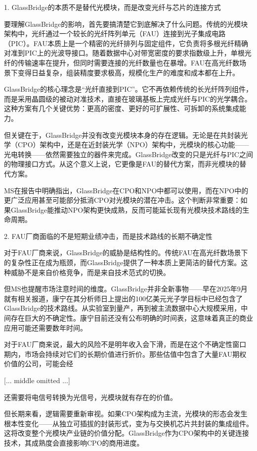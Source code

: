 \documentclass[11pt]{ctexart}
\begin{document}
1. GlassBridge的本质不是替代光模块，而是改变光纤与芯片的连接方式

要理解GlassBridge的影响，首先要搞清楚它到底解决了什么问题。传统的光模块架构中，光纤通过一个较长的光纤阵列单元（FAU）连接到光子集成电路（PIC）。FAU本质上是一个精密的光纤排列与固定组件，它负责将多根光纤精确对准到PIC上的光波导接口。随着数据中心对带宽密度的要求指数级上升，单根光纤的传输速率在提升，但同时需要连接的光纤数量也在暴增。FAU在高光纤数场景下变得日益复杂，组装精度要求极高，规模化生产的难度和成本都在上升。

GlassBridge的核心理念是“光纤直接到PIC”。它不再依赖传统的长光纤阵列组件，而是采用晶圆级的被动对准技术，直接在玻璃基板上完成光纤与PIC的光学耦合。这种方案有几个关键优势：更高的密度、更好的可扩展性、可拆卸的系统集成能力。

但关键在于，GlassBridge并没有改变光模块本身的存在逻辑。无论是在共封装光学（CPO）架构中，还是在近封装光学（NPO）架构中，光模块的核心功能——光电转换——依然需要独立的器件来完成。GlassBridge改变的只是光纤与PIC之间的物理接口方式。从这个意义上说，它更像是FAU的替代方案，而非光模块的替代方案。

MS在报告中明确指出，GlassBridge在CPO和NPO中都可以使用，而在NPO中的更广泛应用甚至可能部分抵消CPO对光模块的潜在冲击。这个判断非常重要：如果GlassBridge能推动NPO架构更快成熟，反而可能延长现有光模块技术路线的生命周期。

2. FAU厂商面临的不是短期业绩冲击，而是技术路线的长期不确定性

对于FAU厂商来说，GlassBridge的威胁是结构性的。传统FAU在高光纤数场景下的复杂性正在成为瓶颈，而GlassBridge提供了一种本质上更简洁的替代方案。这种威胁不是来自价格竞争，而是来自技术范式的切换。

但MS也提醒市场注意时间的维度。GlassBridge并非全新事物——早在2025年9月就有相关报道，康宁在其分析师日上提出的100亿美元光子学目标中已经包含了GlassBridge的技术路线。从实验室到量产，再到被主流数据中心大规模采用，中间存在巨大的不确定性。康宁目前还没有公布明确的时间表，这意味着真正的商业应用可能还需要数年时间。

对于FAU厂商来说，最大的风险不是明年收入会下滑，而是在这个不确定性窗口期内，市场会持续对它们的长期价值进行折价。那些估值中包含了大量FAU期权价值的公司，可能会经

[... middle omitted ...]

还需要将电信号转换为光信号，光模块就有存在的价值。

但长期来看，逻辑需要重新审视。如果CPO架构成为主流，光模块的形态会发生根本性变化——从独立可插拔的封装形式，变为与交换机芯片共封装的集成组件。这将改变整个光模块产业链的价值分配。GlassBridge作为CPO架构中的关键连接技术，其成熟度会直接影响CPO的商用进度。
\end{document}
